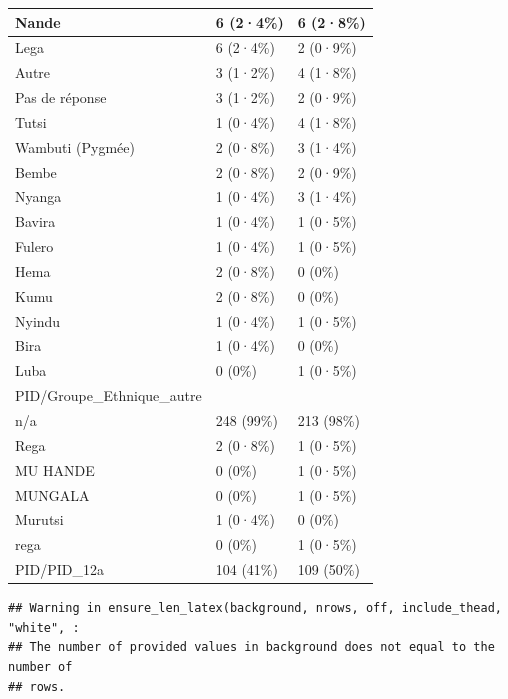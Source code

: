 \documentclass[
]{book}
\begin{document}
\begin{tabular}{l|l|l}
\hline
Nande & 6 (2·4\%) & 6 (2·8\%)\\
\hline
Lega & 6 (2·4\%) & 2 (0·9\%)\\
\hline
Autre & 3 (1·2\%) & 4 (1·8\%)\\
\hline
Pas de réponse & 3 (1·2\%) & 2 (0·9\%)\\
\hline
Tutsi & 1 (0·4\%) & 4 (1·8\%)\\
\hline
Wambuti (Pygmée) & 2 (0·8\%) & 3 (1·4\%)\\
\hline
Bembe & 2 (0·8\%) & 2 (0·9\%)\\
\hline
Nyanga & 1 (0·4\%) & 3 (1·4\%)\\
\hline
Bavira & 1 (0·4\%) & 1 (0·5\%)\\
\hline
Fulero & 1 (0·4\%) & 1 (0·5\%)\\
\hline
Hema & 2 (0·8\%) & 0 (0\%)\\
\hline
Kumu & 2 (0·8\%) & 0 (0\%)\\
\hline
Nyindu & 1 (0·4\%) & 1 (0·5\%)\\
\hline
Bira & 1 (0·4\%) & 0 (0\%)\\
\hline
Luba & 0 (0\%) & 1 (0·5\%)\\
\hline
PID/Groupe\_Ethnique\_autre &  & \\
\hline
n/a & 248 (99\%) & 213 (98\%)\\
\hline
Rega & 2 (0·8\%) & 1 (0·5\%)\\
\hline
MU HANDE & 0 (0\%) & 1 (0·5\%)\\
\hline
MUNGALA & 0 (0\%) & 1 (0·5\%)\\
\hline
Murutsi & 1 (0·4\%) & 0 (0\%)\\
\hline
rega & 0 (0\%) & 1 (0·5\%)\\
\hline
PID/PID\_12a & 104 (41\%) & 109 (50\%)\\
\hline
\end{tabular}

\begin{verbatim}
## Warning in ensure_len_latex(background, nrows, off, include_thead, "white", :
## The number of provided values in background does not equal to the number of
## rows.
\end{verbatim}
\end{document}
